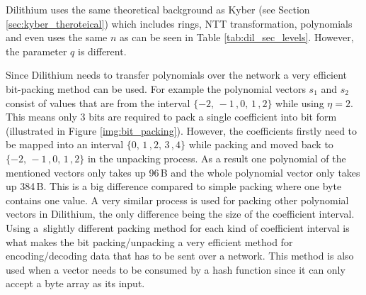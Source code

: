 Dilithium uses the same theoretical background as Kyber (see Section \ref{sec:kyber_theroteical}) which includes rings, NTT transformation, polynomials and even uses the same $n$ as can be seen in Table \ref{tab:dil_sec_levels}. However, the parameter $q$ is different.


Since Dilithium needs to transfer polynomials over the network a very efficient bit-packing method can be used. For example the polynomial vectors $s_1$ and $s_2$ consist of values that are from the interval $\{-2,\,-1\,,0,\,1\,,2\}$ while using $\eta=2$. This means only 3 bits are required to pack a single coefficient into bit form (illustrated in Figure \ref{img:bit_packing}). However, the coefficients firstly need to be mapped into an interval $\{0,\,1\,,2,\,3\,,4\}$ while packing and moved back to $\{-2,\,-1\,,0,\,1\,,2\}$ in the unpacking process. As a result one polynomial of the mentioned vectors only takes up 96\,B and the whole polynomial vector only takes up 384\,B. This is a big difference compared to simple packing where one byte contains one value. A very similar process is used for packing other polynomial vectors in Dilithium, the only difference being the size of the coefficient interval. Using a~slightly different packing method for each kind of coefficient interval is what makes the bit packing/unpacking a very efficient method for encoding/decoding data that has to be sent over a network. This method is also used when a vector needs to be consumed by a hash function since it can only accept a byte array as its input.
